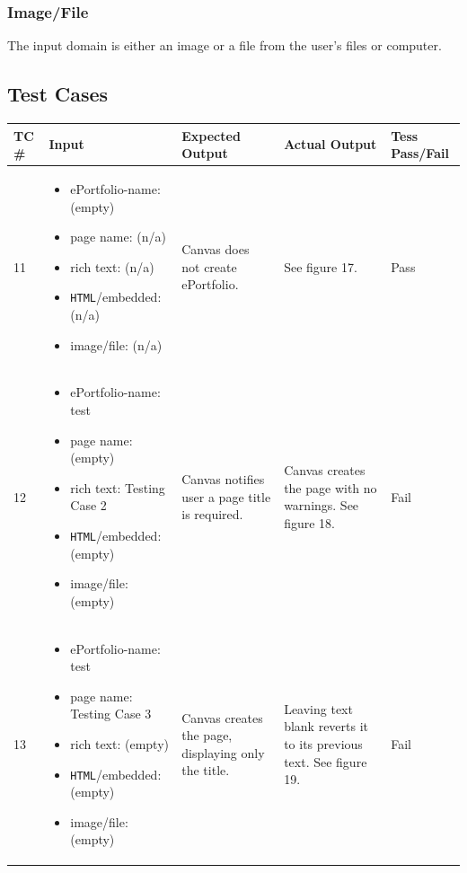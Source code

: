 \documentclass[10pt,letterpaper]{article}
\begin{document}
\subsubsection{Image/File}
The input domain is either an image or a file from the user's files or computer.

\subsection{Test Cases}
\begin{table}[h!]
\begin{tabularx}{\textwidth}{lXXXl}
\toprule
TC \# &
  Input &
  Expected Output &
  Actual Output &
  Tess Pass/Fail \\ \midrule
11 &
  \begin{itemize}
    \item{ePortfolio-name: (empty)}
    \item{page name: (n/a)}
    \item{rich text: (n/a)}
    \item{\texttt{HTML}/embedded: (n/a)}
    \item{image/file: (n/a)}
  \end{itemize} &
   Canvas does not create ePortfolio. &
   See figure 17. &
   Pass \\ \midrule
12 &
  \begin{itemize}
    \item{ePortfolio-name: test}
    \item{page name: (empty)}
    \item{rich text: Testing Case 2}
    \item{\texttt{HTML}/embedded: (empty)}
    \item{image/file: (empty)}
  \end{itemize} &
   Canvas notifies user a page title is required. &
   Canvas creates the page with no warnings. See figure 18. &
   Fail \\ \midrule
13 &
  \begin{itemize}
    \item{ePortfolio-name: test}
    \item{page name: Testing Case 3}
    \item{rich text: (empty)}
    \item{\texttt{HTML}/embedded: (empty)}
    \item{image/file: (empty)}
  \end{itemize} &
   Canvas creates the page, displaying only the title. &
   Leaving text blank reverts it to its previous text. See figure 19. &
   Fail \\ \bottomrule
\end{tabularx}
\end{table}
\end{document}
